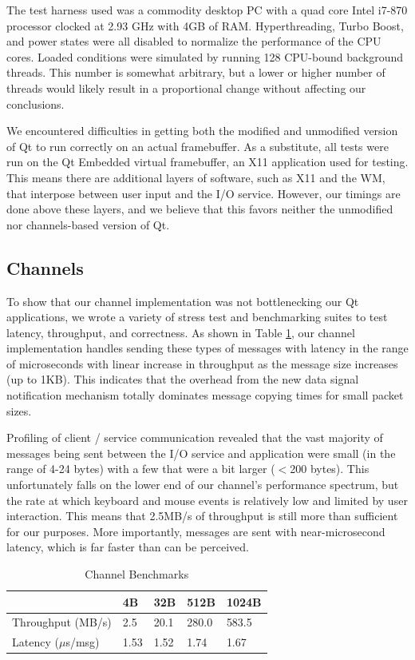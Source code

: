 \documentclass[letterpaper,twocolumn,11pt]{article}
\begin{document}
The test harness used was a commodity desktop PC with a quad core Intel i7-870 processor clocked at 2.93 GHz with 4GB of RAM. Hyperthreading, Turbo Boost, and power states were all disabled to normalize the performance of the CPU cores. Loaded conditions were simulated by running 128 CPU-bound background threads. This number is somewhat arbitrary, but a lower or higher number of threads would likely result in a proportional change without affecting our conclusions.

We encountered difficulties in getting both the modified and unmodified version of Qt to run correctly on an actual framebuffer. As a substitute, all tests were run on the Qt Embedded virtual framebuffer, an X11 application used for testing. This means there are additional layers of software, such as X11 and the WM, that interpose between user input and the I/O service. However, our timings are done above these layers, and we believe that this favors neither the unmodified nor channels-based version of Qt.

\subsection{Channels}

To show that our channel implementation was not bottlenecking our Qt applications, we wrote a variety of stress test and benchmarking suites to test latency, throughput, and correctness. As shown in Table \ref{tab:channel}, our channel implementation handles sending these types of messages with latency in the range of microseconds with linear increase in throughput as the message size increases (up to 1KB). This indicates that the overhead from the new data signal notification mechanism totally dominates message copying times for small packet sizes.

Profiling of client / service communication revealed that the vast majority of messages being sent between the I/O service and application were small (in the range of 4-24 bytes) with a few that were a bit larger ($<$200 bytes). This unfortunately falls on the lower end of our channel's performance spectrum, but the rate at which keyboard and mouse events is relatively low and limited by user interaction. This means that 2.5MB/s of throughput is still more than sufficient for our purposes. More importantly, messages are sent with near-microsecond latency, which is far faster than can be perceived.

\begin{table}[tp]
\caption{Channel Benchmarks}
\centering
\label{tab:channel}
\begin{tabular}{| l | l | l | l | l |}
\hline
						&4B 	& 32B	&512B	&1024B\\ \hline
Throughput (MB/s)		&2.5	&20.1	&280.0	&583.5\\
Latency ($\mu$s/msg)	&1.53	&1.52	&1.74	&1.67\\
\hline
\end{tabular}
\end{table}
\end{document}
